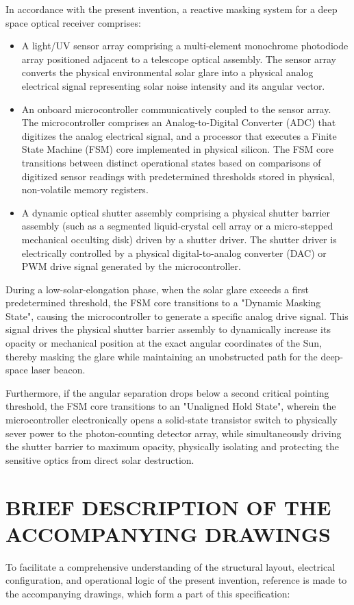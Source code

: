 \documentclass[12pt,a4paper]{article}
\begin{document}
In accordance with the present invention, a reactive masking system for a deep space optical receiver comprises:
\begin{itemize}
    \item A light/UV sensor array comprising a multi-element monochrome photodiode array positioned adjacent to a telescope optical assembly. The sensor array converts the physical environmental solar glare into a physical analog electrical signal representing solar noise intensity and its angular vector.
    \item An onboard microcontroller communicatively coupled to the sensor array. The microcontroller comprises an Analog-to-Digital Converter (ADC) that digitizes the analog electrical signal, and a processor that executes a Finite State Machine (FSM) core implemented in physical silicon. The FSM core transitions between distinct operational states based on comparisons of digitized sensor readings with predetermined thresholds stored in physical, non-volatile memory registers.
    \item A dynamic optical shutter assembly comprising a physical shutter barrier assembly (such as a segmented liquid-crystal cell array or a micro-stepped mechanical occulting disk) driven by a shutter driver. The shutter driver is electrically controlled by a physical digital-to-analog converter (DAC) or PWM drive signal generated by the microcontroller.
\end{itemize}

During a low-solar-elongation phase, when the solar glare exceeds a first predetermined threshold, the FSM core transitions to a "Dynamic Masking State", causing the microcontroller to generate a specific analog drive signal. This signal drives the physical shutter barrier assembly to dynamically increase its opacity or mechanical position at the exact angular coordinates of the Sun, thereby masking the glare while maintaining an unobstructed path for the deep-space laser beacon. 

Furthermore, if the angular separation drops below a second critical pointing threshold, the FSM core transitions to an "Unaligned Hold State", wherein the microcontroller electronically opens a solid-state transistor switch to physically sever power to the photon-counting detector array, while simultaneously driving the shutter barrier to maximum opacity, physically isolating and protecting the sensitive optics from direct solar destruction.

\section*{BRIEF DESCRIPTION OF THE ACCOMPANYING DRAWINGS}
To facilitate a comprehensive understanding of the structural layout, electrical configuration, and operational logic of the present invention, reference is made to the accompanying drawings, which form a part of this specification:
\end{document}
